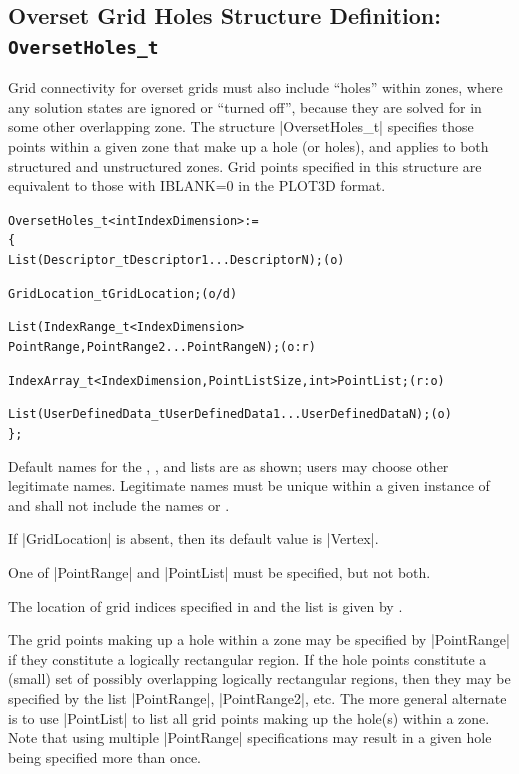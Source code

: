 \subsection{Overset Grid Holes Structure Definition: \texttt{OversetHoles\_t}}
\label{s:OversetHoles}

Grid connectivity for overset grids must also include ``holes'' within zones,
where any solution states are ignored or ``turned off'', because they are
solved for in some other overlapping zone.  The structure |OversetHoles_t|
specifies those points within a given zone that make up a hole (or holes),
and applies to both structured and unstructured zones.
Grid points specified in this structure are equivalent to those with
IBLANK=0 in the PLOT3D format.

\begin{alltt}
  OversetHoles\_t< int IndexDimension > :=
    \{
    List( Descriptor\_t Descriptor1 ... DescriptorN ) ;                      (o)

    GridLocation\_t GridLocation ;                                           (o/d)

    List( IndexRange\_t<IndexDimension> 
      PointRange, PointRange2 ... PointRangeN ) ;                           (o:r)

    IndexArray\_t<IndexDimension, PointListSize, int> PointList ;            (r:o)

    List( UserDefinedData\_t UserDefinedData1 ... UserDefinedDataN ) ;       (o)
    \} ;
\end{alltt}

\begin{notes}
\item
 Default names for the , , and
 lists are as shown; users may choose other legitimate names.
 Legitimate names must be unique 
 within a given instance of  and shall not include the
 names  or .
\item
 If |GridLocation| is absent, then its default value is |Vertex|.
\item
 One of |PointRange| and |PointList| must be specified, but not both.
\end{notes}

The location of grid indices specified in  and the
 list is given by .

The grid points making up a hole within a zone may be specified by
|PointRange| if they constitute a logically rectangular region.  If the hole
points constitute a (small) set of possibly overlapping logically rectangular
regions, then they may be specified by the list |PointRange|, |PointRange2|,
etc.  The more general alternate is to use |PointList| to list all grid
points making up the hole(s) within a zone.
Note that using multiple |PointRange| specifications may result in a
given hole being specified more than once.

